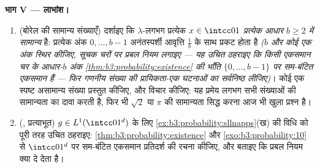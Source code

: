 \begin{problem}
\medskip
\noindent\textbf{भाग V --- लाभांश।}
\begin{enumerate}[resume]
  \item (बोरेल की सामान्य संख्याएँ) दर्शाइए कि $\lambda$-लगभग प्रत्येक
        $x \in \intcc01$ \emph{प्रत्येक आधार $b \geq 2$ में सामान्य} है: प्रत्येक
        अंक $0, \dots, b-1$ अनंतस्पर्शी आवृत्ति $\frac1b$ के साथ प्रकट होता है
        \emph{($b$ और कोई एक अंक स्थिर कीजिए, सूचक चरों पर प्रबल
        नियम लगाइए --- यह उचित ठहराइए कि किसी एकसमान चर के
        आधार-$b$ अंक \cref{thm:b3:probability:existence} की भाँति $\{0,\dots,b-1\}$ पर  सम-बंटित
        एकसमान हैं --- फिर गणनीय संख्या की प्रायिकता-एक घटनाओं का
        सर्वनिष्ठ लीजिए)}। कोई एक स्पष्ट असामान्य संख्या प्रस्तुत
        कीजिए, और विचार कीजिए: यह प्रमेय लगभग सभी संख्याओं की
        सामान्यता का दावा करती है, फिर भी $\sqrt2$ या $\pi$ की
        सामान्यता सिद्ध करना आज भी खुला प्रश्न है।
  \item (, प्रत्याभूत) $g \in L^1(\intcc01^d)$ के लिए \cref{ex:b3:probability:sllnapps}(ख) की विधि
        को पूरी तरह उचित ठहराइए: \cref{thm:b3:probability:existence} और \cref{exo:b3:probability:10} से $\intcc01^d$ पर
         सम-बंटित एकसमान प्रतिदर्श की रचना कीजिए, और
        बताइए कि प्रबल नियम क्या दे देता है।
\end{enumerate}


\end{problem}
